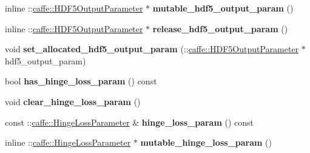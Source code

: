 \begin{DoxyCompactItemize}
\item 
\mbox{\label{classcaffe_1_1_layer_parameter_ab16be37cbbf3699abbe95ff80bed69ea}} 
inline \+::\mbox{\hyperlink{classcaffe_1_1_h_d_f5_output_parameter}{caffe\+::\+H\+D\+F5\+Output\+Parameter}} $\ast$ {\bfseries mutable\+\_\+hdf5\+\_\+output\+\_\+param} ()
\item 
\mbox{\label{classcaffe_1_1_layer_parameter_a5ea73fdf7733f9559c316d83b82f7616}} 
inline \+::\mbox{\hyperlink{classcaffe_1_1_h_d_f5_output_parameter}{caffe\+::\+H\+D\+F5\+Output\+Parameter}} $\ast$ {\bfseries release\+\_\+hdf5\+\_\+output\+\_\+param} ()
\item 
\mbox{\label{classcaffe_1_1_layer_parameter_aa545485ab8c93aa0f38f1dbf3bbcedc3}} 
void {\bfseries set\+\_\+allocated\+\_\+hdf5\+\_\+output\+\_\+param} (\+::\mbox{\hyperlink{classcaffe_1_1_h_d_f5_output_parameter}{caffe\+::\+H\+D\+F5\+Output\+Parameter}} $\ast$hdf5\+\_\+output\+\_\+param)
\item 
\mbox{\label{classcaffe_1_1_layer_parameter_a4cbbcf8230181dbcc96a3ce386c448c6}} 
bool {\bfseries has\+\_\+hinge\+\_\+loss\+\_\+param} () const
\item 
\mbox{\label{classcaffe_1_1_layer_parameter_a194775a44243b15c57fdf7558e26e65b}} 
void {\bfseries clear\+\_\+hinge\+\_\+loss\+\_\+param} ()
\item 
\mbox{\label{classcaffe_1_1_layer_parameter_a5320a955f202db4c4b72329bc9183ae2}} 
const \+::\mbox{\hyperlink{classcaffe_1_1_hinge_loss_parameter}{caffe\+::\+Hinge\+Loss\+Parameter}} \& {\bfseries hinge\+\_\+loss\+\_\+param} () const
\item 
\mbox{\label{classcaffe_1_1_layer_parameter_a9caa05346236f6bbf5369e08bcc18d77}} 
inline \+::\mbox{\hyperlink{classcaffe_1_1_hinge_loss_parameter}{caffe\+::\+Hinge\+Loss\+Parameter}} $\ast$ {\bfseries mutable\+\_\+hinge\+\_\+loss\+\_\+param} ()
\item 
\mbox{\label{classcaffe_1_1_layer_parameter_a8fceafcca7cc27c8f95e8c30da47ee41}} 

\end{DoxyCompactItemize}
